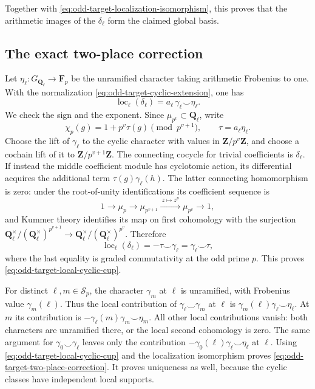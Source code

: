 Together with
\eqref{eq:odd-target-localization-isomorphism},
this proves that the arithmetic images of the
\(\delta_\ell\) form the claimed global basis.

\subsection{The exact two-place correction}

Let \(\eta_\ell:G_{\mathbf Q_\ell}\to\mathbf F_p\)
be the unramified character taking arithmetic
Frobenius to one.  With the normalization
\eqref{eq:odd-target-cyclic-extension}, one has
\begin{equation}\label{eq:odd-target-local-cyclic-cup}
 \operatorname{loc}_\ell(\delta_\ell)
                   =a_\ell\,\gamma_\ell\smile\eta_\ell.
\end{equation}
We check the sign and the exponent.  Since
\(\mu_{p^v}\subset\mathbf Q_\ell\), write
\[
       \chi_p(g)=1+p^v\tau(g)\pmod{p^{v+1}},
       \qquad \tau=a_\ell\eta_\ell.
\]
Choose the lift of \(\gamma_\ell\) to the cyclic
character with values in \(\mathbf Z/p^v\mathbf Z\),
and choose a cochain lift of it to
\(\mathbf Z/p^{v+1}\mathbf Z\).
The connecting cocycle for trivial coefficients is
\(\delta_\ell\).  If instead the middle coefficient
module has cyclotomic action, its differential
acquires the additional term
\(\tau(g)\gamma_\ell(h)\).
The latter connecting homomorphism is zero: under
the root-of-unity identifications its coefficient
sequence is
\[
                  1\longrightarrow\mu_p
                   \longrightarrow\mu_{p^{v+1}}
                     \xrightarrow{\ z\mapsto z^p\ }\mu_{p^v}
                       \longrightarrow1,
\]
and Kummer theory identifies its map on first
cohomology with the surjection
\(\mathbf Q_\ell^\times/(\mathbf Q_\ell^\times)^{p^{v+1}}
\to\mathbf Q_\ell^\times/(\mathbf Q_\ell^\times)^{p^v}\).
Therefore
\[
       \operatorname{loc}_\ell(\delta_\ell)
             =-\tau\smile\gamma_\ell
             =\gamma_\ell\smile\tau,
\]
where the last equality is graded commutativity
at the odd prime \(p\).  This proves
\eqref{eq:odd-target-local-cyclic-cup}.

For distinct \(\ell,m\in\mathcal S_p\), the
character \(\gamma_m\) at \(\ell\) is unramified,
with Frobenius value \(\gamma_m(\ell)\).  Thus
the local contribution of
\(\gamma_\ell\smile\gamma_m\) at \(\ell\)
is \(\gamma_m(\ell)\gamma_\ell\smile\eta_\ell\).
At \(m\) its contribution is
\(-\gamma_\ell(m)\gamma_m\smile\eta_m\).
All other local contributions vanish: both
characters are unramified there, or the local
second cohomology is zero.  The same argument for
\(\gamma_0\smile\gamma_\ell\) leaves only the
contribution \(-\gamma_0(\ell)
\gamma_\ell\smile\eta_\ell\) at \(\ell\).
Using \eqref{eq:odd-target-local-cyclic-cup} and
the localization isomorphism proves
\eqref{eq:odd-target-two-place-correction}.
It proves uniqueness as well, because the cyclic
classes have independent local supports.

